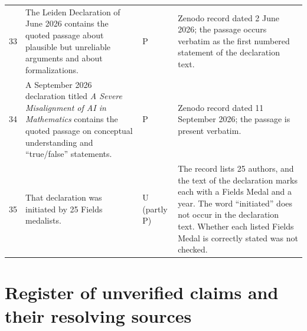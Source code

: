 \begin{longtable}{@{}p{}p{}p{}p{}@{}}
33 & The Leiden Declaration of June 2026 contains the quoted passage about plausible but unreliable arguments and about formalizations. & P & Zenodo record dated 2 June 2026; the passage occurs verbatim as the first numbered statement of the declaration text. \\
34 & A September 2026 declaration titled \emph{A Severe Misalignment of AI in Mathematics} contains the quoted passage on conceptual understanding and ``true/false'' statements. & P & Zenodo record dated 11 September 2026; the passage is present verbatim. \\
35 & That declaration was initiated by 25 Fields medalists. & U (partly P) & The record lists 25 authors, and the text of the declaration marks each with a Fields Medal and a year. The word ``initiated'' does not occur in the declaration text. Whether each listed Fields Medal is correctly stated was not checked. \\
\end{longtable}

\section{Register of unverified claims and their resolving sources}

